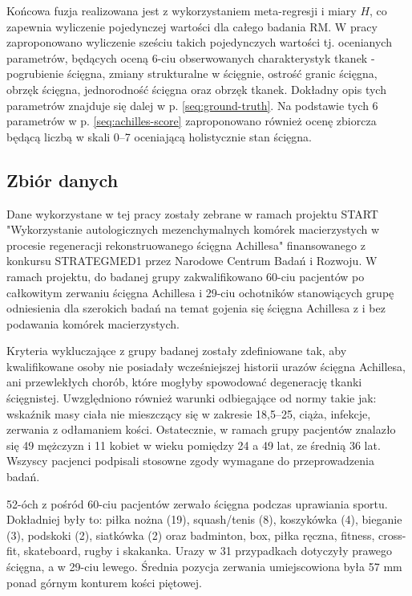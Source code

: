 Końcowa fuzja realizowana jest z wykorzystaniem meta-regresji i miary $H$, co zapewnia wyliczenie pojedynczej wartości dla całego badania RM. W pracy zaproponowano wyliczenie sześciu takich pojedynczych wartości tj. ocenianych parametrów, będących oceną 6-ciu obserwowanych charakterystyk tkanek - pogrubienie ścięgna, zmiany strukturalne w ścięgnie, ostrość granic ścięgna, obrzęk ścięgna, jednorodność ścięgna oraz obrzęk tkanek. Dokładny opis tych parametrów znajduje się dalej w p. \ref{seq:ground-truth}. Na podstawie tych 6 parametrów w p. \ref{seq:achilles-score} zaproponowano również ocenę zbiorcza będącą liczbą w skali 0--7 oceniającą holistycznie stan ścięgna.

\subsection{Zbiór danych}
\label{seq:zbior-danych}
Dane wykorzystane w tej pracy zostały zebrane w ramach projektu START "Wykorzystanie autologicznych mezenchymalnych komórek macierzystych w procesie regeneracji rekonstruowanego ścięgna Achillesa" finansowanego z konkursu STRATEGMED1 przez Narodowe Centrum Badań i Rozwoju. W ramach projektu, \linebreak do badanej grupy zakwalifikowano 60-ciu pacjentów po całkowitym zerwaniu ścięgna Achillesa i 29-ciu ochotników stanowiących grupę odniesienia dla szerokich badań na temat gojenia się ścięgna Achillesa z i bez podawania komórek macierzystych. 

Kryteria wykluczające z grupy badanej zostały zdefiniowane tak, aby kwalifikowane osoby nie posiadały wcześniejszej historii urazów ścięgna Achillesa, ani przewlekłych chorób, które mogłyby spowodować degenerację tkanki ścięgnistej. Uwzględniono również warunki odbiegające od normy takie jak: wskaźnik masy ciała nie mieszczący się w zakresie 18,5--25, ciąża, infekcje, zerwania z odłamaniem kości. Ostatecznie, w ramach grupy pacjentów znalazło się 49 mężczyzn i 11 kobiet w wieku pomiędzy 24 a 49 lat, ze średnią 36 lat. Wszyscy pacjenci podpisali stosowne zgody wymagane do przeprowadzenia badań.   

52-óch z pośród 60-ciu pacjentów zerwało ścięgna podczas uprawiania sportu. Dokładniej były to: piłka nożna (19), squash/tenis (8), koszykówka (4), bieganie (3), podskoki (2), siatkówka (2) oraz badminton, box, piłka ręczna, fitness, cross-fit, skateboard, rugby i skakanka. Urazy w 31 przypadkach dotyczyły prawego ścięgna, \linebreak a w 29-ciu lewego. Średnia pozycja zerwania umiejscowiona była 57 mm ponad górnym konturem kości piętowej.

